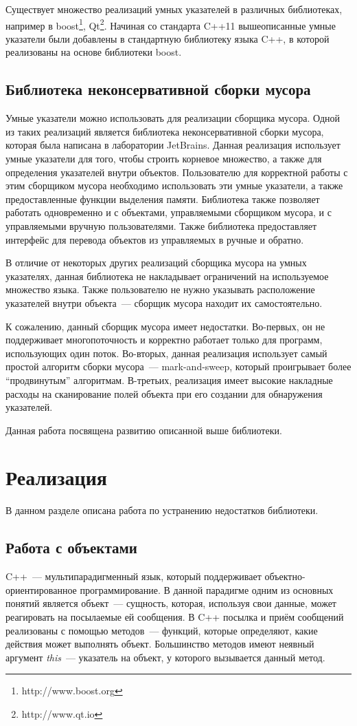 Существует множество реализаций умных указателей в различных библиотеках, например в boost\footnote{http://www.boost.org}, Qt\footnote{http://www.qt.io}. Начиная со стандарта C++11 вышеописанные умные указатели были добавлены в стандартную библиотеку языка C++, в которой реализованы на основе библиотеки boost.

\subsection{Библиотека неконсервативной сборки мусора}
Умные указатели можно использовать для реализации сборщика мусора. Одной из таких реализаций является библиотека неконсервативной сборки мусора, которая была написана в лаборатории JetBrains.
Данная реализация использует умные указатели для того, чтобы строить корневое множество, а также для определения указателей внутри объектов. Пользователю для корректной работы с этим сборщиком мусора необходимо использовать эти умные указатели, а также предоставленные функции выделения памяти.
Библиотека также позволяет работать одновременно и с объектами, управляемыми сборщиком мусора, и с управляемыми вручную пользователями. Также библиотека предоставляет интерфейс для перевода объектов из управляемых в ручные и обратно.

В отличие от некоторых других реализаций сборщика мусора на умных указателях, данная библиотека не накладывает ограничений на используемое множество языка.
Также пользователю не нужно указывать расположение указателей внутри объекта~--- сборщик мусора находит их самостоятельно.

К сожалению, данный сборщик мусора имеет недостатки. Во-первых, он не поддерживает многопоточность и корректно работает только для программ, использующих один поток. Во-вторых, данная реализация использует самый простой алгоритм сборки мусора~--- mark-and-sweep, который проигрывает более ``продвинутым'' алгоритмам.
В-третьих, реализация имеет высокие накладные расходы на сканирование полей объекта при его создании для обнаружения указателей.

Данная работа посвящена развитию описанной выше библиотеки.


\section{Реализация}
В данном разделе описана работа по устранению недостатков библиотеки.
\subsection{Работа с объектами}
C++~--- мультипарадигменный язык, который поддерживает
объектно-ориентированное программирование. В данной парадигме одним из основных
понятий является объект~--- сущность, которая, используя свои данные, может реагировать
на посылаемые ей сообщения. В C++ посылка и приём сообщений реализованы с помощью методов~--- 
функций, которые определяют, какие действия может выполнять объект. 
Большинство методов имеют неявный аргумент \textit{this}~--- указатель на объект,
у которого вызывается данный метод. 

